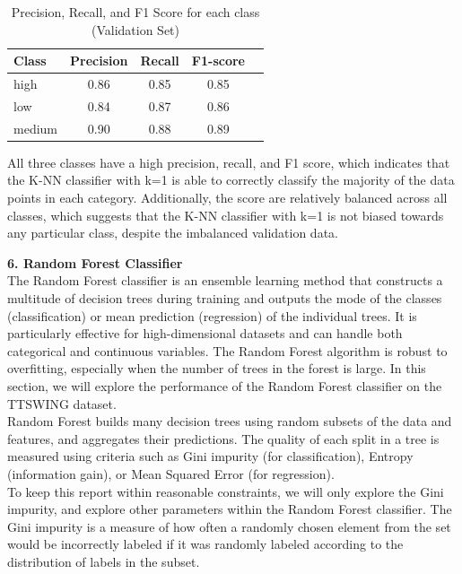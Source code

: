 \documentclass[12pt]{article}
\begin{document}
\begin{table}[H]
\centering
\caption{Precision, Recall, and F1 Score for each class (Validation Set)}
\label{tab:knn_prf1}
\begin{tabular}{lcccc}
\toprule
Class      & Precision & Recall & F1-score \\
\midrule
high       & 0.86      & 0.85   & 0.85     \\
low        & 0.84      & 0.87   & 0.86     \\
medium     & 0.90      & 0.88   & 0.89     \\
\bottomrule
\end{tabular}
\end{table}

All three classes have a high precision, recall, and F1 score, which indicates that the K-NN classifier with k=1 is able to correctly classify the majority of the data points in each category. Additionally, the score are relatively balanced across all classes, which suggests that the K-NN classifier with k=1 is not biased towards any particular class, despite the imbalanced validation data.


\vspace{20pt}

\textbf{6. Random Forest Classifier}
\\
The Random Forest classifier is an ensemble learning method that constructs a multitude of decision trees during training and outputs the mode of the classes (classification) or mean prediction (regression) of the individual trees. It is particularly effective for high-dimensional datasets and can handle both categorical and continuous variables. The Random Forest algorithm is robust to overfitting, especially when the number of trees in the forest is large. In this section, we will explore the performance of the Random Forest classifier on the TTSWING dataset.
\\
Random Forest builds many decision trees using random subsets of the data and features, and aggregates their predictions. The quality of each split in a tree is measured using criteria such as Gini impurity (for classification), Entropy (information gain), or Mean Squared Error (for regression). 
\\
To keep this report within reasonable constraints, we will only explore the Gini impurity, and explore other parameters within the Random Forest classifier. The Gini impurity is a measure of how often a randomly chosen element from the set would be incorrectly labeled if it was randomly labeled according to the distribution of labels in the subset. 
\end{document}
